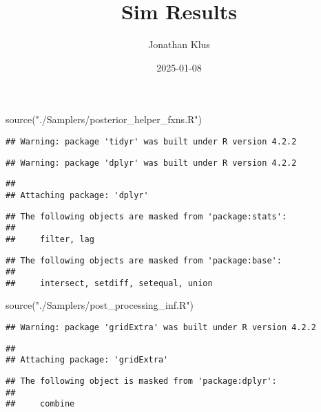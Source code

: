 \documentclass[
]{article}
\title{Sim Results}
\author{Jonathan Klus}
\date{2025-01-08}
\newenvironment{Shaded}{\begin{snugshade}}{\end{snugshade}}
\newcommand{\FunctionTok}[1]{\textcolor[rgb]{0.00,0.00,0.00}{#1}}
\newcommand{\NormalTok}[1]{#1}
\newcommand{\StringTok}[1]{\textcolor[rgb]{0.31,0.60,0.02}{#1}}
\begin{document}
\maketitle

\begin{Shaded}
\begin{Highlighting}[]
\FunctionTok{source}\NormalTok{(}\StringTok{"./Samplers/posterior\_helper\_fxns.R"}\NormalTok{)}
\end{Highlighting}
\end{Shaded}

\begin{verbatim}
## Warning: package 'tidyr' was built under R version 4.2.2
\end{verbatim}

\begin{verbatim}
## Warning: package 'dplyr' was built under R version 4.2.2
\end{verbatim}

\begin{verbatim}
## 
## Attaching package: 'dplyr'
\end{verbatim}

\begin{verbatim}
## The following objects are masked from 'package:stats':
## 
##     filter, lag
\end{verbatim}

\begin{verbatim}
## The following objects are masked from 'package:base':
## 
##     intersect, setdiff, setequal, union
\end{verbatim}

\begin{Shaded}
\begin{Highlighting}[]
\FunctionTok{source}\NormalTok{(}\StringTok{"./Samplers/post\_processing\_inf.R"}\NormalTok{)}
\end{Highlighting}
\end{Shaded}

\begin{verbatim}
## Warning: package 'gridExtra' was built under R version 4.2.2
\end{verbatim}

\begin{verbatim}
## 
## Attaching package: 'gridExtra'
\end{verbatim}

\begin{verbatim}
## The following object is masked from 'package:dplyr':
## 
##     combine
\end{verbatim}
\end{document}
